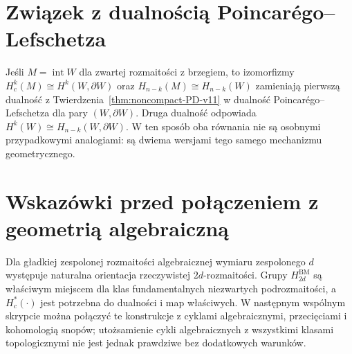 \section{Związek z dualnością Poincarégo--Lefschetza}
Jeśli $M=\operatorname{int}W$ dla zwartej rozmaitości
z brzegiem, to izomorfizmy
$H_c^k(M)\cong H^k(W,\partial W)$ oraz
$H_{n-k}(M)\cong H_{n-k}(W)$
zamieniają pierwszą dualność z
Twierdzenia~\ref{thm:noncompact-PD-v11}
w dualność Poincarégo--Lefschetza dla pary
$(W,\partial W)$. Druga dualność odpowiada
$H^k(W)\cong H_{n-k}(W,\partial W)$.
W ten sposób oba równania nie są osobnymi
przypadkowymi analogiami: są dwiema wersjami
tego samego mechanizmu geometrycznego.

\section{Wskazówki przed połączeniem z geometrią algebraiczną}
Dla gładkiej zespolonej rozmaitości algebraicznej
wymiaru zespolonego $d$ występuje naturalna orientacja
rzeczywistej $2d$-rozmaitości. Grupy
$H_{2d}^{\mathrm{BM}}$ są właściwym miejscem dla klas
fundamentalnych niezwartych podrozmaitości, a
$H_c^*(\cdot)$ jest potrzebna do dualności i map
właściwych. W następnym wspólnym skrypcie można
połączyć te konstrukcje z cyklami algebraicznymi,
przecięciami i kohomologią snopów; utożsamienie
cykli algebraicznych z wszystkimi klasami topologicznymi
nie jest jednak prawdziwe bez dodatkowych warunków.


